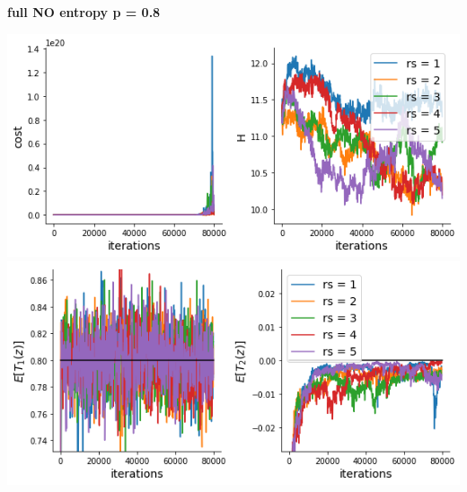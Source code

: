 \documentclass[11pt]{article}
\begin{document}
\textbf{full NO entropy p = 0.8}
\begin{center}
\includegraphics[scale=0.6]{figs/cost_H_SC_full_c=0_p=80.png} \\
\includegraphics[scale=0.6]{figs/constraints_SC_full_c=0_p=80.png}
\end{center}
\end{document}
